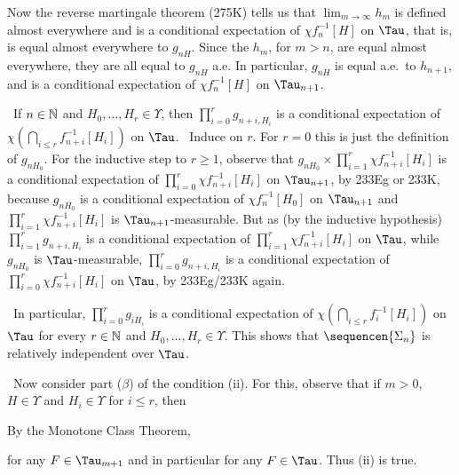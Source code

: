 {Now the reverse martingale theorem (275K) tells us that
$\lim_{m\to\infty}h_m$ is
defined almost everywhere and is a conditional expectation of
$\chi f_n^{-1}[H]$ on $\Tau$, that is, is equal almost everywhere to
$g_{nH}$.   Since the $h_m$, for $m>n$, are equal almost everywhere,
they are all equal to $g_{nH}$ a.e.   In particular, $g_{nH}$ is equal
a.e.\ to $h_{n+1}$, and is a
conditional expectation of $\chi f_n^{-1}[H]$ on $\Tau_{n+1}$.\ \Qed

\medskip

\quad\grheadc\ If $n\in\Bbb N$ and $H_0,\ldots,H_r\in\Upsilon$, then
$\prod_{i=0}^rg_{n+i,H_i}$ is a conditional expectation of
$\chi(\bigcap_{i\le r}f_{n+i}^{-1}[H_i])$ on $\Tau$.   \Prf\ Induce on
$r$.   For $r=0$ this is just the definition of $g_{nH_0}$.   For
the inductive step to $r\ge 1$, observe that
$g_{nH_0}\times\prod_{i=1}^r\chi f_{n+i}^{-1}[H_i]$ is a
conditional expectation of $\prod_{i=0}^r\chi f_{n+i}^{-1}[H_i]$
on $\Tau_{n+1}$, by 233Eg or 233K, because $g_{nH_0}$ is a
conditional expectation of $\chi f_n^{-1}[H_0]$ on $\Tau_{n+1}$ and
$\prod_{i=1}^r\chi f_{n+i}^{-1}[H_i]$ is
$\Tau_{n+1}$-measurable.   But as (by the inductive hypothesis)
$\prod_{i=1}^rg_{n+i,H_i}$ is a conditional expectation of
$\prod_{i=1}^r\chi f_{n+i}^{-1}[H_i]$ on $\Tau$, while $g_{nH_0}$ is
$\Tau$-measurable,
$\prod_{i=0}^rg_{n+i,H_i}$ is a conditional expectation of
$\prod_{i=0}^r\chi f_{n+i}^{-1}[H_i]$ on $\Tau$, by 233Eg/233K
again.\ \Qed

\medskip

\quad\grheadd\ In particular, $\prod_{i=0}^rg_{iH_i}$ is a conditional
expectation of $\chi(\bigcap_{i\le r}f_i^{-1}[H_i])$ on $\Tau$ for every
$r\in\Bbb N$ and $H_0,\ldots,H_r\in\Upsilon$.   This
shows that $\sequencen{\Sigma_n}$ is relatively independent over $\Tau$.

\medskip

\quad\grheade\ Now consider part ($\beta$) of the condition (ii).   For
this, observe
that if $m>0$, $H\in\Upsilon$ and $H_i\in\Upsilon$ for $i\le r$, then


\noindent By the Monotone Class Theorem,


\noindent for any $F\in\Tau_{m+1}$ and in particular for any
$F\in\Tau$.
Thus (ii) is true.

}
